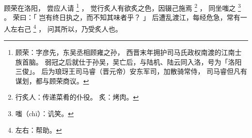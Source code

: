 
\switchcolumn*[\section{}]

顾荣在洛阳，
尝应人请%
\footnote{%
    顾荣：字彦先，东吴丞相顾雍之孙，
          西晋末年拥护司马氏政权南渡的江南士族首脑。
          弱冠之后就仕于孙吴，吴亡后，与陆机、陆云同入洛，号为「洛阳三俊」。
          后为琅玡王司马睿（晋元帝）安东军司，加散骑常侍，
          司马睿但凡有谋划，都与顾荣商议。
}%
，
觉行炙人有欲炙之色，因辍己施焉%
\footnote{%
    行炙人：传递菜肴的仆役。
    炙：烤肉。
}%
，
同坐嗤之%
\footnote{%
    嗤（chī）：讥笑。
}%
。
荣曰：「
    岂有终日执之，而不知其味者乎？
」
后遭乱渡江，每经危急，常有一人左右己%
\footnote{%
    左右：帮助。
}%
，
问其所以，乃受炙人也。

\switchcolumn



